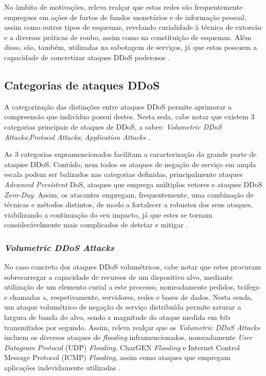 No âmbito de motivações, releva realçar que estas redes são frequentemente empregues em ações de furtos de fundos monetários e de informação pessoal, assim como outros tipos de esquemas, revelando curialidade à técnica de extorsão e a diversas práticas de roubo, assim como na constituição de esquemas. Além disso, são, também, utilizadas na sabotagem de serviços, já que estas possuem a capacidade de concretizar ataques DDoS poderosos \cite{kaspersky_botnets_2017}.

\subsection{Categorias de ataques DDoS}
A categorização das distinções entre ataques DDoS permite aprimorar a compreensão que indivíduo possuí destes. Nesta seda, cabe notar que existem 3 categorias principais de ataques de DDoS, a saber: \textit{Volumetric DDoS Attacks};\textit{Protocol Attacks}; \textit{Application Attacks} \cite{esecurityplanet_types_of_ddos_attacks,connectwise_types_of_ddos_attacks}.

As 3 categorias supramencionados facilitam a caracterização da grande parte de ataques DDoS. Contúdo, nem todos os ataques de negação de serviço em ampla escala podem ser balizados nas categorias definidas, principalmente ataques \textit{Advanced Persistent} DoS, ataques que emprega múltiplos vetores e ataques DDoS \textit{Zero-Day}. Assim, os atacantes empregam, frequentemente, uma combinação de técnicas e métodos distintos, de modo a fortalecer a robustez dos seus ataques, viabilizando a continuação do seu impacto, já que estes se tornam considerávelmente mais complicados de detetar e mitigar \cite{esecurityplanet_types_of_ddos_attacks,connectwise_types_of_ddos_attacks}.

\subsubsection{\textit{Volumetric DDoS Attacks}}

No caso concreto dos ataques DDoS volumétricos, cabe notar que estes procuram sobrecarregar a capacidade de recursos de um dispositivo alvo, mediante utilização de um elemento curial a este processo, nomeadamente pedidos, tráfego e chamadas a, respetivamente, servidores, redes e bases de dados. Nesta senda, um ataque volumétrico de negação de serviço distribuída permite saturar a largura de banda do alvo, sendo a magnitude do ataque medida em \textit{bits} transmitidos por segundo. Assim, releva realçar que os \textit{Volumetric DDoS Attacks} incluem os diversos ataques de \textit{flooding} inframencionados, nomeadamente \textit{User Datagram Protocol} (UDP) \textit{Flooding}, CharGEN \textit{Flooding} e Internet Control Message Protocol (ICMP) \textit{Flooding}, assim como ataques que empregam aplicações indevidamente utilizadas \cite{esecurityplanet_types_of_ddos_attacks}.

